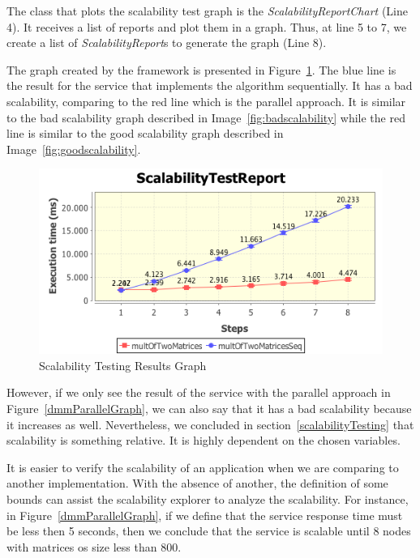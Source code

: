 The class that plots the scalability test graph is the \emph{ScalabilityReportChart} (Line 4). It receives a list of reports and plot them in a graph. Thus, at line 5 to 7, we create a list of \emph{ScalabilityReport}s to generate the graph (Line 8).

The graph created by the framework is presented in Figure~\ref{dmmGraph}. The blue line is the result for the service that implements the algorithm sequentially. It has a bad scalability, comparing to the red line which is the parallel approach. It is similar to the bad scalability graph described in Image~\ref{fig:badscalability} while the red line is similar to the good scalability graph described in Image~\ref{fig:goodscalability}.

\begin{figure}[htbp]
\begin{center}
	\includegraphics[scale=0.8]{images/twoTestsReportLinear8}
\caption{Scalability Testing Results Graph}
\label{dmmGraph}
\end{center}
\end{figure}

However, if we only see the result of the service with the parallel approach in Figure~\ref{dmmParallelGraph}, we can also say that it has a bad scalability because it increases as well. Nevertheless, we concluded in section~\ref{scalabilityTesting} that scalability is something relative. It is highly dependent on the chosen variables. 

It is easier to verify the scalability of an application when we are comparing to another implementation. With the absence of another, the definition of some bounds can assist the scalability explorer to analyze the scalability. For instance, in Figure~\ref{dmmParallelGraph}, if we define that the service response time must be less then 5 seconds, then we conclude that the service is scalable until 8 nodes with matrices os size less than 800. 

